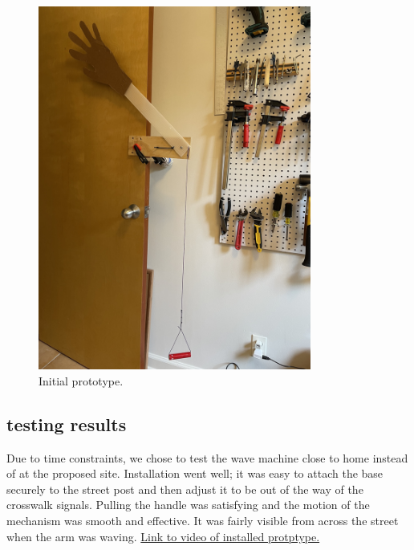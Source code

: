 \documentclass[11pt]{report}
\begin{document}
\begin{figure}[ht!]
\centering
\includegraphics[width=0.8\textwidth, angle=-90]{"images/II/prototype_2.JPG"}
\caption{Initial prototype.}
\end{figure}

\subsection*{testing results}

Due to time constraints, we chose to test the wave machine close to home instead of at the proposed site. Installation went well; it was easy to attach the base securely to the street post and then adjust it to be out of the way of the crosswalk signals. Pulling the handle was satisfying and the motion of the mechanism was smooth and effective. It was fairly visible from across the street when the arm was waving. \href{https://drive.google.com/file/d/1Gzw53p0xpSqZ-RktlmBlWZ7QyR_WPB5E/view?usp=sharing}{Link to video of installed protptype.}
\end{document}
